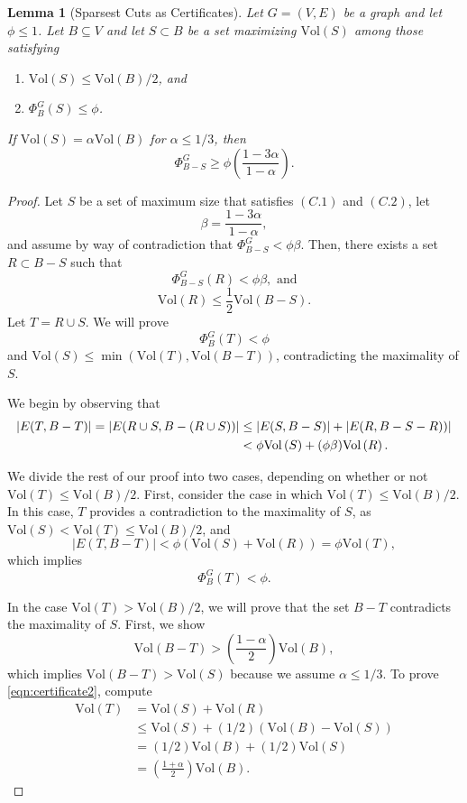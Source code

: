 \documentclass[11pt]{article}
\newtheorem{lemma}[theorem]{Lemma}
\def\union{\cup}
\def\sizeof#1{\left|#1  \right|}
\def\vol#1{\mathrm{Vol}\left(#1  \right)}
\def\conducin#1#2{\Phi^{G}_{#1}\left(#2  \right)}
\def\Conducin#1{\Phi^{G}_{#1}}
\begin{document}
\begin{lemma}[Sparsest Cuts as Certificates]\label{lem:certificate}
Let $G = (V,E)$ be a graph and let $\phi \leq 1$.
Let $B \subseteq V$ and let $S \subset B$ be a set
  maximizing $\vol{S}$ among those
  satisfying
\begin{enumerate}
\item [(C.1)]  $\vol{S} \leq \vol{B}/2$, and
\item [(C.2)] $\conducin{B}{S} \leq \phi$.
\end{enumerate}
If $\vol{S} = \alpha  \vol{B}$ for $\alpha \leq 1/3$,
  then
\[
  \Conducin{B-S}{} \geq \phi \left(\frac{1-3 \alpha}{1 - \alpha } \right).
\]
\end{lemma}
\begin{proof}
Let $S$ be a set of maximum size that satisfies $(C.1)$ and $(C.2)$,
  let
\[
\beta = \frac{1-3\alpha}{1-\alpha},
\]
and
  assume by way of contradiction that
  $\Conducin{B-S}{} < \phi \beta .$
Then, there exists a set
  $R \subset B-S$
  such that
\[
  \conducin{B-S}{R} < \phi \beta , \text{ and}
\]
\[
  \vol{R} \leq \frac{1}{2}\vol{B-S}.
\]
Let $T = R \union S$.
We will prove
\[
  \conducin{B}{T} < \phi
\]
and $\vol{S} \leq \min \left(\vol{T}, \vol{B-T} \right)$,
  contradicting the maximality of $S$.

We begin by observing that
\begin{align}
  \sizeof{E (T, B - T) } = 
  \sizeof{E (R \union S, B - (R \union S))}
& \leq
 \sizeof{E (S, B - S)}
+
 \sizeof{E (R, B - S - R))} \notag \\
& <
 \phi \vol{S}
+
 (\phi \beta ) \vol{R}. \label{eqn:certificate1}
\end{align}

We divide the rest of our proof into two cases, depending on whether
  or not $\vol{T} \leq \vol{B}/2$.
First, consider the case in which
  $\vol{T} \leq \vol{B}/2$.
In this case, $T$ provides a contradiction to the maximality of
  $S$, as $\vol{S} < \vol{T} \leq \vol{B}/2$,
  and
\[
  \sizeof{E (T, B - T) }
< \phi \left(\vol{S} + \vol{R} \right) = \phi \vol{T},
\]
which implies
\[
  \conducin{B}{T} < \phi .
\]

In the case $\vol{T} > \vol{B}/2$,
  we will prove that the set $B - T$ contradicts the maximality of $S$.
First, we show
\begin{equation}\label{eqn:certificate2}
\vol{B-T} > \left( \frac{1-\alpha}{2} \right) \vol{B},
\end{equation}
which implies
  $\vol{B-T} > \vol{S}$ because we assume $\alpha \leq 1/3$.
To prove \eqref{eqn:certificate2}, compute
\begin{align*}
  \vol{T} & = \vol{S} + \vol{R}\\
 &  \leq \vol{S} + (1/2) (\vol{B} - \vol{S})\\
 & = (1/2) \vol{B} + (1/2) \vol{S}\\
 & = \left(\frac{1+\alpha}{2} \right) \vol{B}.
\end{align*}


\end{proof}
\end{document}
